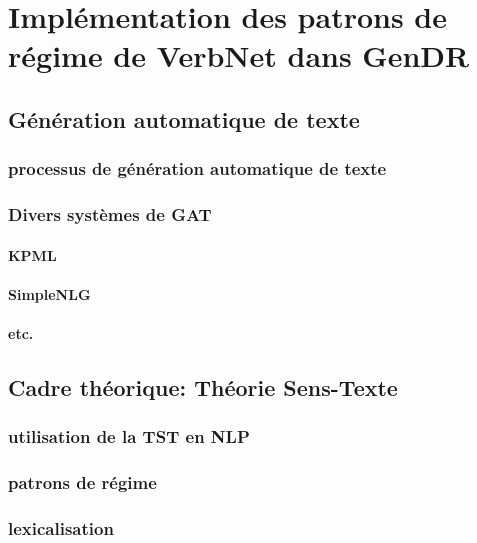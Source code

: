 \chapter{Implémentation des patrons de régime de VerbNet dans GenDR}

\section{Génération automatique de texte}

\subsection{processus de génération automatique de texte}

\subsection{Divers systèmes de GAT}

\subsubsection{KPML}

\subsubsection{SimpleNLG}

\subsubsection{etc.}

\section{Cadre théorique: Théorie Sens-Texte}

\subsection{utilisation de la TST en NLP}

\subsection{patrons de régime}

\subsection{lexicalisation}

